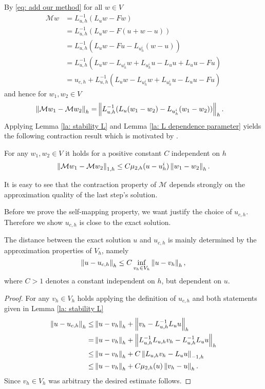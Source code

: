 By \eqref{eq: add our method} for all $w \in V$
\begin{align}
	\mathcal M w &= L_{u,h}^{-1}(L_u w - Fw) \nonumber\\
				 &= L_{u,h}^{-1}(L_u w - F(u+w-u)) \nonumber\\
				 &= L_{u,h}^{-1}(L_u w - Fu - L_{u^i_h} (w-u)) \nonumber\\
				 &=  L_{u,h}^{-1}(L_u w - L_{u^i_h} w + L_{u^i_h}u - L_u u + L_u u - Fu) \nonumber\\
				 & = u_{c,h} + L_{u,h}^{-1}(L_u w - L_{u^i_h} w + L_{u^i_h}u - L_u u - Fu) \label{eq: expand M}
 \end{align}
and hence for $w_1, w_2 \in V$
\begin{align*}
	\left\lVert \mathcal M w_1 - \mathcal M w_2 \right\rVert_{h} =& \left\lVert L_{u,h}^{-1}(L_u (w_1-w_2) - L_{u^i_h} (w_1-w_2)) \right\rVert_{h}.
\end{align*}
Applying Lemma \ref{la: stability L} and Lemma \ref{la: L dependence parameter} yields the following contraction result which is motivated by \cite[Lemma 3.4]{BGN+2011}.
\begin{lemma} \label{la: contraction property M}
	For any $w_1, w_2 \in V$ it holds for a positive constant $C$ independent on $h$
\begin{align*}
	\left\lVert \mathcal M w_1 - \mathcal M w_2 \right\rVert_{1,h}	\leq C \mu_{2,h}(u - u^i_h) \left\lVert w_1 - w_2 \right\rVert_{h}. \label{eq: estimate M}
\end{align*}
\end{lemma}
It is easy to see that the contraction property of $\mathcal{M}$ depends strongly on the approximation quality of the last step's solution. %

Before we prove the self-mapping property, we want justify the choice of $u_{c,h}$. Therefore we show $u_{c,h}$ is close to the exact \MA solution.

\begin{lemma}\label{la: difference u uch}
	The distance between the exact solution $u$ and $u_{c,h}$ is mainly determined by the approximation properties of $V_h$, namely
	\[
		\left\lVert u-u_{c,h} \right\rVert_{h} \leq C \inf_{v_h \in V_h} \left\lVert u-v_h \right\rVert_{h},
	\]
	where $C>1$ denotes a constant independent on $h$, but dependent on $u$.
\end{lemma}
\begin{proof}
	For any $v_h \in V_h$ holds applying the definition of $u_{c,h}$ and both statements given in Lemma \ref{la: stability L}
	\begin{align}
		\left\lVert u-u_{c,h} \right\rVert_{h} \leq& \left\lVert u- v_h \right\rVert_{h} + \left\lVert  v_h- L_{u,h}^{-1}L_u u \right\rVert_{h} \nonumber \\
			=& \left\lVert u- v_h \right\rVert_{h} + \left\lVert L_{u,h}^{-1}L_{u,h} v_h- L_{u,h}^{-1}L_u u \right\rVert_{h} \nonumber \\
			\leq& \left\lVert u- v_h \right\rVert_{h} + C \left\lVert L_{u,h} v_h-  L_u u \right\rVert_{-1,h} \nonumber \\
			\leq& \left\lVert u- v_h \right\rVert_{h} + C \mu_{2,h}(u)\left\lVert v_h -u \right\rVert_{h}. \nonumber
	\end{align}
	Since $v_h \in V_h$ was arbitrary the desired estimate follows.
\end{proof}

